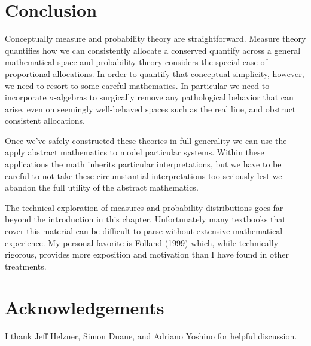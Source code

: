 \documentclass[
  letterpaper,
  DIV=11,
  numbers=noendperiod]{scrartcl}
\begin{document}
\hypertarget{conclusion}{%
\section{Conclusion}\label{conclusion}}

Conceptually measure and probability theory are straightforward. Measure
theory quantifies how we can consistently allocate a conserved quantify
across a general mathematical space and probability theory considers the
special case of proportional allocations. In order to quantify that
conceptual simplicity, however, we need to resort to some careful
mathematics. In particular we need to incorporate \(\sigma\)-algebras to
surgically remove any pathological behavior that can arise, even on
seemingly well-behaved spaces such as the real line, and obstruct
consistent allocations.

Once we've safely constructed these theories in full generality we can
use the apply abstract mathematics to model particular systems. Within
these applications the math inherits particular interpretations, but we
have to be careful to not take these circumstantial interpretations too
seriously lest we abandon the full utility of the abstract mathematics.

The technical exploration of measures and probability distributions goes
far beyond the introduction in this chapter. Unfortunately many
textbooks that cover this material can be difficult to parse without
extensive mathematical experience. My personal favorite is Folland
(1999) which, while technically rigorous, provides more exposition and
motivation than I have found in other treatments.

\hypertarget{acknowledgements}{%
\section{Acknowledgements}\label{acknowledgements}}

I thank Jeff Helzner, Simon Duane, and Adriano Yoshino for helpful
discussion.
\end{document}

